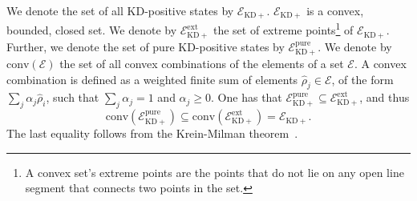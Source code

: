 \documentclass[%
 reprint,
superscriptaddress,
nofootinbib,
bibnotes,
 amsmath,amssymb,
 aps,
]{revtex4-1}
\theoremstyle{plain}
\newcommand{\EcalKDC}{{\mathcal E}_{\mathrm{KD+}}}
\newcommand{\EcalKDCpu}{{\mathcal E}_{\mathrm{KD+}}^{\mathrm{pure}}}
\newcommand{\EcalKDCext}{{\mathcal E}_{\mathrm{KD+}}^{\mathrm{ext}}}
\newcommand{\conv}[1]{\mathrm{conv}\left(#1\right)}
\begin{document}
We denote the set of all KD-positive states by $\EcalKDC$.
$\EcalKDC$ is a convex, bounded, closed set. We denote by $\EcalKDCext$ the set of  extreme points\footnote{A convex set's extreme points are the points that do not lie on any open line segment  that connects two points in the set.} of $\EcalKDC$. Further, we denote the set of  pure KD-positive states by $\EcalKDCpu$. We denote by $\conv{\mathcal{E}}$ the set of all convex combinations of the elements of a set $\mathcal{E}$.  A convex combination is defined as a weighted finite  sum of elements  $ \hat{\rho}_j\in\mathcal E$, of the form $\sum_j \alpha_j \hat{\rho}_i$, such that $\sum_j \alpha_j =1$ and $\alpha_j \ge 0$. One has that $\EcalKDCpu \subseteq \EcalKDCext$, and thus
\begin{equation}
\conv{\EcalKDCpu} \subseteq \conv{\EcalKDCext}=\EcalKDC .
\end{equation}
The last equality follows from the Krein-Milman theorem~\cite{hiriart-urrutylemarechal2001}.  
\end{document}
